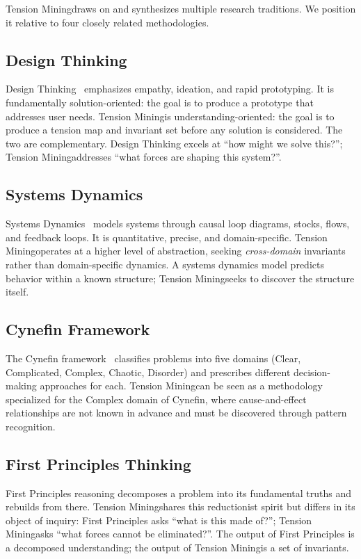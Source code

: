 \documentclass[11pt,a4paper]{article}
\newcommand{\methodname}{Tension Mining}
\begin{document}
\methodname draws on and synthesizes multiple research traditions. We position it relative to four closely related methodologies.

\subsection{Design Thinking}
Design Thinking~\cite{schon1983reflective,cross2006designerly} emphasizes empathy, ideation, and rapid prototyping. It is fundamentally solution-oriented: the goal is to produce a prototype that addresses user needs. \methodname is understanding-oriented: the goal is to produce a tension map and invariant set before any solution is considered. The two are complementary. Design Thinking excels at ``how might we solve this?''; \methodname addresses ``what forces are shaping this system?''.

\subsection{Systems Dynamics}
Systems Dynamics~\cite{meadows2008thinking} models systems through causal loop diagrams, stocks, flows, and feedback loops. It is quantitative, precise, and domain-specific. \methodname operates at a higher level of abstraction, seeking \emph{cross-domain} invariants rather than domain-specific dynamics. A systems dynamics model predicts behavior within a known structure; \methodname seeks to discover the structure itself.

\subsection{Cynefin Framework}
The Cynefin framework~\cite{snowden2007leader} classifies problems into five domains (Clear, Complicated, Complex, Chaotic, Disorder) and prescribes different decision-making approaches for each. \methodname can be seen as a methodology specialized for the Complex domain of Cynefin, where cause-and-effect relationships are not known in advance and must be discovered through pattern recognition.

\subsection{First Principles Thinking}
First Principles reasoning decomposes a problem into its fundamental truths and rebuilds from there. \methodname shares this reductionist spirit but differs in its object of inquiry: First Principles asks ``what is this made of?''; \methodname asks ``what forces cannot be eliminated?''. The output of First Principles is a decomposed understanding; the output of \methodname is a set of invariants.
\end{document}

